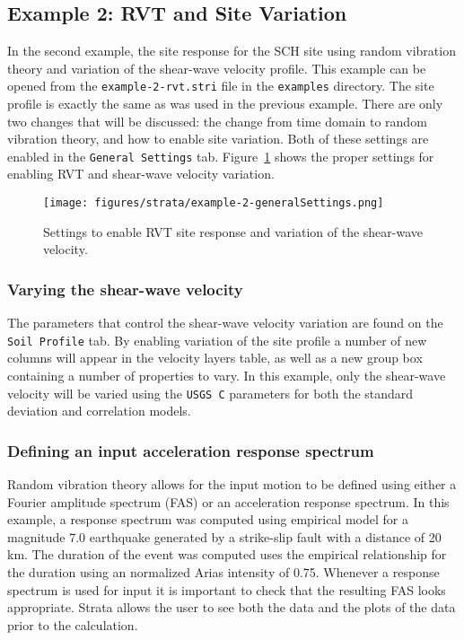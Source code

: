 \documentclass[12pt,oneside]{book}
\begin{document}
\subsection{Example 2: RVT and Site Variation}\label{ch:strata:example:2}
In the second example, the site response for the SCH site using random vibration theory and
variation of the shear-wave velocity profile. This example can be opened from the
\texttt{example-2-rvt.stri} file in the \texttt{examples} directory.  The site profile is exactly
the same as was used in the previous example.  There are only two changes that will be discussed:
the change from time domain to random vibration theory, and how to enable site variation.  Both of
these settings are enabled in the \texttt{General Settings} tab.
Figure~\ref{fig:strata:example:2:generalSettings} shows the proper settings for enabling RVT and
shear-wave velocity variation.

\begin{figure}[h]
    \begin{center}
        \texttt{[image: figures/strata/example-2-generalSettings.png]}
    \end{center}
    \caption{Settings to enable RVT site response and variation of the shear-wave velocity.}
    \label{fig:strata:example:2:generalSettings}
\end{figure}

\subsubsection{Varying the shear-wave velocity}
The parameters that control the shear-wave velocity variation are found on the \texttt{Soil Profile}
tab.  By enabling variation of the site profile a number of new columns will appear in the velocity
layers table, as well as a new group box containing a number of properties to vary.  In this
example, only the shear-wave velocity will be varied using the \texttt{USGS C} parameters for both
the standard deviation and correlation models.

\subsubsection{Defining an input acceleration response spectrum}
Random vibration theory allows for the input motion to be defined using either a Fourier amplitude
spectrum (FAS) or an acceleration response spectrum.  In this example, a response spectrum was computed
using \citet{abrahamson:97} empirical model for a magnitude 7.0 earthquake generated by a
strike-slip fault with a distance of 20 km.  The duration of the event was computed uses the
\citet{abrahamson:96} empirical relationship for the duration using an normalized Arias intensity of
0.75.  Whenever a response spectrum is used for input it is important to check that the resulting
FAS looks appropriate.  Strata allows the user to see both the data and the plots of the data prior
to the calculation.


\newpage


\backmatter
\printindex
\end{document}
